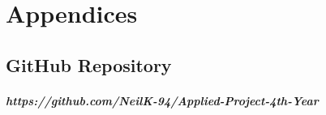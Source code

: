 \chapter{Appendices}
\section{GitHub Repository}
\paragraph{https://github.com/NeilK-94/Applied-Project-4th-Year}
